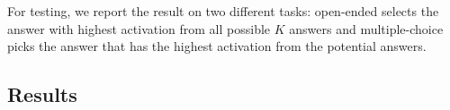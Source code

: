For testing, we report the result on two different tasks: open-ended selects the answer with highest activation from all possible $K$ answers and multiple-choice picks the answer that has the highest activation from the potential answers. 

\subsection{Results}
\label{sec:results}

